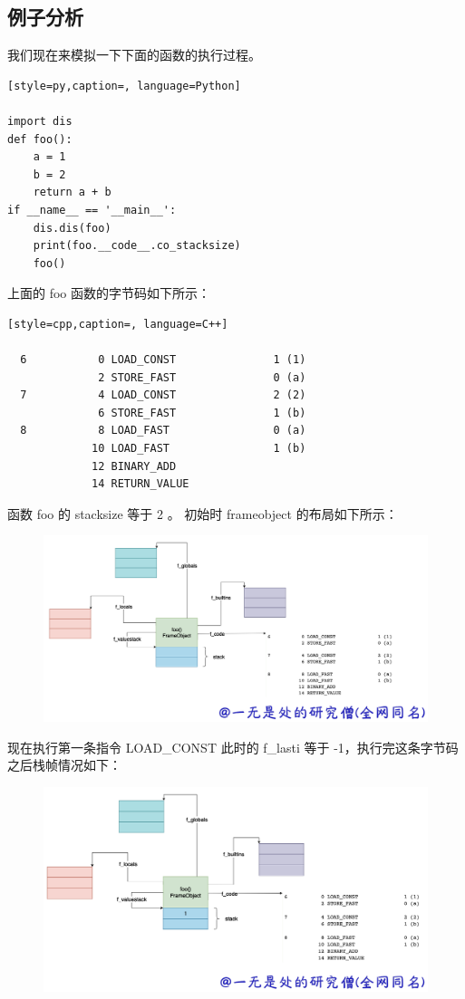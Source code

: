 \subsection{例子分析}
我们现在来模拟一下下面的函数的执行过程。
\begin{lstlisting}[style=py,caption=, language=Python]

import dis
def foo():
    a = 1
    b = 2
    return a + b
if __name__ == '__main__':
    dis.dis(foo)
    print(foo.__code__.co_stacksize)
    foo()
\end{lstlisting}
上面的 foo 函数的字节码如下所示：
\begin{lstlisting}[style=cpp,caption=, language=C++]

  6           0 LOAD_CONST               1 (1)
              2 STORE_FAST               0 (a)
  7           4 LOAD_CONST               2 (2)
              6 STORE_FAST               1 (b)
  8           8 LOAD_FAST                0 (a)
             10 LOAD_FAST                1 (b)
             12 BINARY_ADD
             14 RETURN_VALUE
\end{lstlisting}
函数 foo 的 stacksize 等于 2 。
初始时 frameobject 的布局如下所示：

    \begin{figure}[H]
        \centering
            \includegraphics[scale=.25]{images/73-frame.png}
						\caption{ }
        \label{fig:my_label}
    \end{figure}
    
现在执行第一条指令 LOAD\_CONST 此时的 f\_lasti 等于 -1，执行完这条字节码之后栈帧情况如下：

    \begin{figure}[H]
        \centering
            \includegraphics[scale=.25]{images/74-frame.png}
						\caption{ }
        \label{fig:my_label}
    \end{figure}
    
